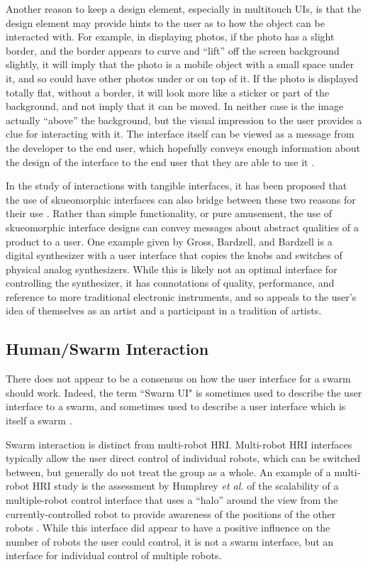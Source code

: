 Another reason to keep a design element, especially in multitouch UIs, is that the design element may provide hints to the user as to how the object can be interacted with. 
For example, in displaying photos, if the photo has a slight border, and the border appears to curve and ``lift'' off the screen background slightly, it will imply that the photo is a mobile object with a small space under it, and so could have other photos under or on top of it. 
If the photo is displayed totally flat, without a border, it will look more like a sticker or part of the background, and not imply that it can be moved. 
In neither case is the image actually ``above'' the background, but the visual impression to the user provides a clue for interacting with it. 
The interface itself can be viewed as a message from the developer to the end user, which hopefully conveys enough information about the design of the interface to the end user that they are able to use it \citep{derboven2012semiotic}. 

In the study of interactions with tangible interfaces, it has been proposed that the use of skueomorphic interfaces can also bridge between these two reasons for their use \citep{gross2014skeu}.
Rather than simple functionality, or pure amusement, the use of skueomorphic interface designs can convey messages about abstract qualities of a product to a user. 
One example given by Gross, Bardzell, and Bardzell is a digital synthesizer with a user interface that copies the knobs and switches of physical analog synthesizers. 
While this is likely not an optimal interface for controlling the synthesizer, it has connotations of quality, performance, and reference to more traditional electronic instruments, and so appeals to the user's idea of themselves as an artist and a participant in a tradition of artists. 

\subsection{Human/Swarm Interaction} \label{section:Existing_Research_on_Swarm_Controlability}

There does not appear to be a consensus on how the user interface for a swarm should work.
Indeed, the term ``Swarm UI" is sometimes used to describe the user interface to a swarm, and sometimes used to describe a user interface which is itself a swarm \citep{le2016zooids, suzuki2018reactile}.

Swarm interaction is distinct from multi-robot HRI. 
Multi-robot HRI interfaces typically allow the user direct control of individual robots, which can be switched between, but generally do not treat the group as a whole. 
An example of a multi-robot HRI study is the assessment by Humphrey \emph{et al.} of the scalability of a multiple-robot control interface that uses a ``halo'' around the view from the currently-controlled robot to provide awareness of the positions of the other robots \citep{humphrey2007assessing}.
While this interface did appear to have a positive influence on the number of robots the user could control, it is not a swarm interface, but an interface for individual control of multiple robots. 

